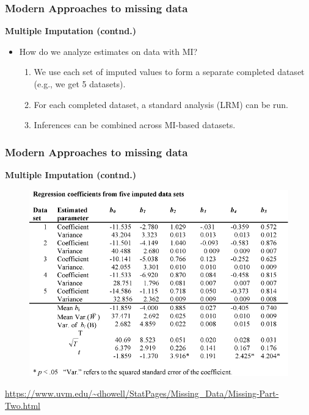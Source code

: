 \documentclass{beamer}
\begin{document}
\begin{frame}
\frametitle{Modern Approaches to missing data}
\vspace{0.2cm}
\textbf{Multiple Imputation (contnd.) }
\vspace{0.2cm}
  \begin{itemize}
  \item[] How do we analyze estimates on data with MI?
  \begin{enumerate}
  \vspace{0.5cm}
  \item We use each set of imputed values to form a separate completed dataset (e.g., we get 5 datasets).
  \vspace{0.2cm}
  \item For each completed dataset, a standard analysis (LRM) can be run.
  \vspace{0.2cm}
  \item Inferences can be combined across MI-based datasets.
  \end{enumerate}
 \end{itemize}
 
\end{frame}



\begin{frame}

\frametitle{Modern Approaches to missing data}
\textbf{Multiple Imputation (contnd.) }
\begin{figure}
\includegraphics[width=0.7\linewidth]{IMG/mitable.jpg}
\end{figure}

\scriptsize{\url{https://www.uvm.edu/~dhowell/StatPages/Missing_Data/Missing-Part-Two.html}}

\end{frame}
\end{document}
